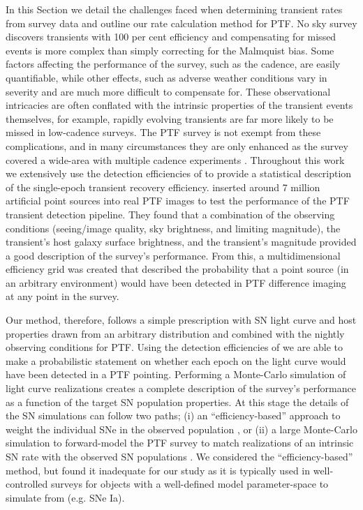 \documentclass[a4paper,fleqn,usenatbib]{mnras}
\begin{document}
In this Section we detail the challenges faced when determining transient rates from survey data and outline our rate calculation method for PTF. No sky survey discovers transients with 100 per cent efficiency and compensating for missed events is more complex than simply correcting for the Malmquist bias. Some factors affecting the performance of the survey, such as the cadence, are easily quantifiable, while other effects, such as adverse weather conditions vary in severity and are much more difficult to compensate for. These observational intricacies are often conflated with the intrinsic properties of the transient events themselves, for example, rapidly evolving transients are far more likely to be missed in low-cadence surveys. The PTF survey is not exempt from these complications, and in many circumstances they are only enhanced as the survey covered a wide-area with multiple cadence experiments \citep{PTF_REF}. Throughout this work we extensively use the detection efficiencies of \cite{Frohmaier17} to provide a statistical description of the single-epoch transient recovery efficiency. \citet{Frohmaier17} inserted around 7 million artificial point sources into real PTF images to test the performance of the PTF transient detection pipeline. They found that a combination of the observing conditions (seeing/image quality, sky brightness, and limiting magnitude), the transient's host galaxy surface brightness, and the transient's magnitude provided a good description of the survey's performance. From this, a multidimensional efficiency grid was created that described the probability that a point source (in an arbitrary environment) would have been detected in PTF difference imaging at any point in the survey.

Our method, therefore, follows a simple prescription with SN light curve and host properties drawn from an arbitrary distribution and combined with the nightly observing conditions for PTF. Using the detection efficiencies of \citet{Frohmaier17} we are able to make a probabilistic statement on whether each epoch on the light curve would have been detected in a PTF pointing. Performing a Monte-Carlo simulation of light curve realizations creates a complete description of the survey's performance as a function of the target SN population properties. At this stage the details of the SN simulations can follow two paths; (i) an ``efficiency-based'' approach to weight the individual SNe in the observed population \citep[e.g.][]{Perrett12, Frohmaier19}, or (ii) a large Monte-Carlo simulation to forward-model the PTF survey to match realizations of an intrinsic SN rate with the observed SN populations \citep[e.g.][]{Prajs2016,Frohmaier18}. We considered the ``efficiency-based'' method, but found it inadequate for our study as it is typically used in well-controlled surveys for objects with a well-defined model parameter-space to simulate from (e.g. SNe Ia).
\end{document}
